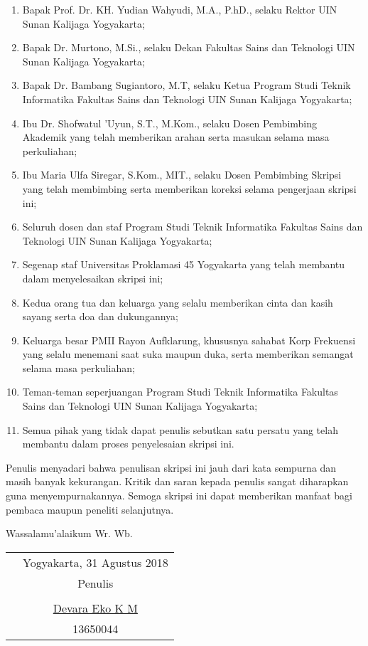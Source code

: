 \documentclass{jtetiskripsi}
\begin{document}
\begin{enumerate}
\itemsep0em
\item Bapak Prof. Dr. KH. Yudian Wahyudi, M.A., P.hD., selaku Rektor UIN Sunan Kalijaga Yogyakarta;
\item Bapak Dr. Murtono, M.Si., selaku Dekan Fakultas Sains dan Teknologi UIN Sunan Kalijaga Yogyakarta; 
\item Bapak Dr. Bambang Sugiantoro, M.T, selaku Ketua Program Studi Teknik Informatika Fakultas Sains dan Teknologi UIN Sunan Kalijaga Yogyakarta;
\item Ibu Dr. Shofwatul 'Uyun, S.T., M.Kom., selaku Dosen Pembimbing Akademik yang telah memberikan arahan serta masukan selama masa perkuliahan;
\item Ibu Maria Ulfa Siregar, S.Kom., MIT., selaku Dosen Pembimbing Skripsi yang telah membimbing serta memberikan koreksi selama pengerjaan skripsi ini;
\item Seluruh dosen dan staf Program Studi Teknik Informatika Fakultas Sains dan Teknologi UIN Sunan Kalijaga Yogyakarta;
\item Segenap staf Universitas Proklamasi 45 Yogyakarta yang telah membantu dalam menyelesaikan skripsi ini;
\item Kedua orang tua dan keluarga yang selalu memberikan cinta dan kasih sayang serta doa dan dukungannya;
\item Keluarga besar PMII Rayon Aufklarung, khususnya sahabat Korp Frekuensi yang selalu menemani saat suka maupun duka, serta memberikan semangat selama masa perkuliahan;
\item Teman-teman seperjuangan Program Studi Teknik Informatika Fakultas Sains dan Teknologi UIN Sunan Kalijaga Yogyakarta;
\item Semua pihak yang tidak dapat penulis sebutkan satu persatu yang telah membantu dalam proses penyelesaian skripsi ini.

\end{enumerate}

Penulis menyadari bahwa penulisan skripsi ini jauh dari kata sempurna dan masih banyak kekurangan. Kritik dan saran kepada penulis sangat diharapkan guna menyempurnakannya. Semoga skripsi ini dapat memberikan manfaat bagi pembaca maupun peneliti selanjutnya.

\vspace{0.5cm}

Wassalamu'alaikum Wr. Wb.

\begin{tabular}{p{7.5cm}c}
&Yogyakarta, 31 Agustus 2018\\
& Penulis \\
&\\
& \underline{Devara Eko K M} \\
& 13650044
\end{tabular}
\end{document}
